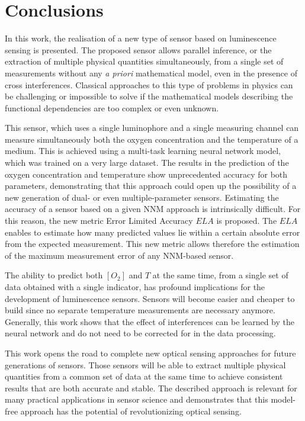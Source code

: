 \documentclass[sensors,article,submit,moreauthors,pdftex,10pt,a4paper]{Definitions/mdpi}
\begin{document}
\section{Conclusions}

In this work, the realisation of a new type of sensor based on luminescence sensing is presented. The proposed sensor allows parallel inference, or the extraction of multiple physical quantities simultaneously, from a single set of measurements without any {\sl a priori} mathematical model, even in the presence of cross interferences. Classical approaches to this type of problems in physics can be challenging or impossible to solve if the mathematical models describing the functional dependencies are too complex or even unknown.

This sensor, which uses a single luminophore and a single measuring channel can measure simultaneously both the oxygen concentration and the temperature of a medium. This is achieved using a multi-task learning neural network model, which was trained on a very large dataset. The results in the prediction of the oxygen concentration and temperature show unprecedented accuracy for both parameters, demonstrating that this approach could open up the possibility of a new generation of dual- or even multiple-parameter sensors.
Estimating the accuracy of a sensor based on a given NNM approach is intrinsically difficult. For this reason, the new metric Error Limited Accuracy $ELA$ is proposed. The $ELA$ enables to estimate how many predicted values lie within a certain absolute error from the expected measurement. This new metric allows therefore the estimation of the maximum measurement error of any NNM-based sensor.

The ability to predict both $[O_2]$ and $T$ at the same time, from a single set of data obtained with a single indicator, has profound implications for the development of luminescence sensors. Sensors will become easier and cheaper to build since no separate temperature measurements are necessary anymore. Generally, this work shows that the effect of interferences can be learned by the neural network and do not need to be corrected for in the data processing. 

This work opens the road to complete new optical sensing approaches for future generations of sensors. Those sensors will be able to extract multiple physical quantities from a common set of data at the same time to achieve consistent results that are both accurate and stable. The described approach is relevant for many practical applications in sensor science and demonstrates that this model-free approach has the potential of revolutionizing optical sensing.
\end{document}
